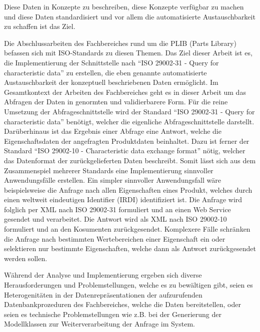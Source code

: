 Diese Daten in Konzepte zu beschreiben, diese Konzepte verfügbar zu machen und diese Daten standardisiert und vor allem die automatisierte Austauschbarkeit zu schaffen ist das Ziel. 

Die Abschlussarbeiten des Fachbereiches rund um die PLIB (Parts Library) befassen sich mit ISO-Standards zu diesen Themen. Das Ziel dieser Arbeit ist es, die Implementierung der Schnittstelle nach \enquote{ISO 29002-31 - Query for characteristic data} zu erstellen, die eben genannte automatisierte Austauschbarkeit der konzeptuell beschriebenen Daten ermöglicht. Im Gesamtkontext der Arbeiten des Fachbereiches geht es in dieser Arbeit um das Abfragen der Daten in genormten und validierbarere Form. Für die reine Umsetzung der Abfrageschnittstelle wird der Standard \enquote{ISO 29002-31 - Query for characteristic data} benötigt, welcher die eigenliche Abfrageschnittstelle darstellt. Darüberhinaus ist das Ergebnis einer Abfrage eine Antwort, welche die Eigenschaftsdaten der angefragten Produktdaten beinhaltet. Dazu ist ferner der Standard \enquote{ISO 29002-10 - Characteristic data exchange format} nötig, welcher das Datenformat der zurückgelieferten Daten beschreibt. Somit lässt sich aus dem Zusammenspiel mehrerer Standards eine Implementierung sinnvoller Anwendungsfälle erstellen. Ein simpler sinnvoller Anwendungsfall wäre beispielsweise die Anfrage nach allen Eigenschaften eines Produkt, welches durch einen weltweit eindeutigen Identifier (IRDI) identifiziert ist. Die Anfrage wird folglich per XML nach ISO 29002-31 formuliert und an einen Web Service gesendet und verarbeitet. Die Antwort wird als XML nach ISO 29002-10 formuliert und an den Kosumenten zurückgesendet. Komplexere Fälle schränken die Anfrage nach bestimmten Wertebereichen einer Eigenschaft ein oder selektieren nur bestimmte Eigenschaften, welche dann als Antwort zurückgesendet werden sollen. 

Während der Analyse und Implementierung ergeben sich diverse Herausforderungen und Problemstellungen, welche es zu bewältigen gibt, seien es Heterogenitäten in der Datenrepräsentationen der aufzurufenden Datenbankprozeduren des Fachbereiches, welche die Daten bereitstellen, oder seien es technische Problemstellungen wie z.B. bei der Generierung der Modellklassen zur Weiterverarbeitung der Anfrage im System.  




